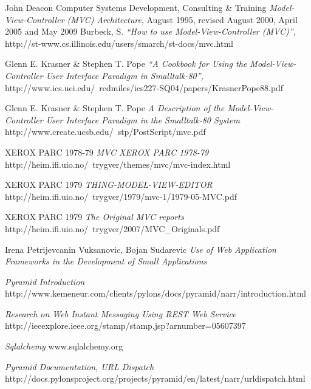 \documentclass[finnish,utf8,nonumbib,palatino,kandi]{gradu2}
\begin{document}
\begin{thebibliography}{9} %
    John Deacon Computer Systems Development, Consulting \& Training
    \emph{Model-View-Controller (MVC) Architecture},
    August 1995, revised August 2000, April 2005 and May 2009
   Burbeck, S.
  \emph{“How to use Model-View-Controller (MVC)”,}
  http://st-www.cs.illinois.edu/users/smarch/st-docs/mvc.html
 
   Glenn E. Krasner \& Stephen T. Pope
  \emph{“A Cookbook for Using the Model-View-Controller User Interface Paradigm in Smalltalk-80”,}
http://www.ics.uci.edu/~redmiles/ics227-SQ04/papers/KrasnerPope88.pdf

   Glenn E. Krasner \& Stephen T. Pope
  \emph{A Description of the Model-View-Controller User Interface Paradigm in the Smalltalk-80 System}
   http://www.create.ucsb.edu/~stp/PostScript/mvc.pdf

  XEROX PARC 1978-79
  \emph{MVC XEROX PARC 1978-79}
http://heim.ifi.uio.no/~trygver/themes/mvc/mvc-index.html

  XEROX PARC 1979
  \emph{THING-MODEL-VIEW-EDITOR}
   http://heim.ifi.uio.no/~trygver/1979/mvc-1/1979-05-MVC.pdf

  XEROX PARC 1979
  \emph{The Original MVC reports}
 http://heim.ifi.uio.no/~trygver/2007/MVC\_Originals.pdf

Irena Petrijevcanin Vuksanovic, Bojan Sudarevic
  \emph{Use of Web Application Frameworks in the Development of Small Applications}


  \emph{Pyramid Introduction}
   http://www.kemeneur.com/clients/pylons/docs/pyramid/narr/introduction.html

\emph{Research on Web Instant Messaging Using REST Web Service}
http://ieeexplore.ieee.org/stamp/stamp.jsp?arnumber=05607397

\emph{Sqlalchemy}
www.sqlalchemy.org

\emph{Pyramid Documentation, URL Dispatch}
http://docs.pylonsproject.org/projects/pyramid/en/latest/narr/urldispatch.html



\end{thebibliography}
\end{document}
